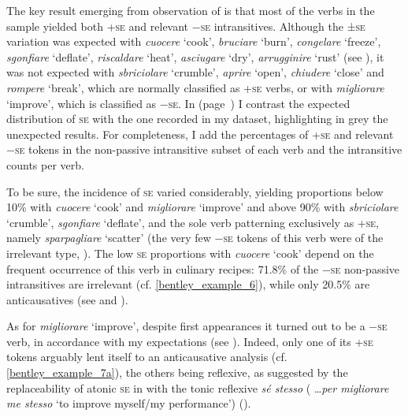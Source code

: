 \documentclass[output=paper,colorlinks,citecolor=brown
]{langscibook}
\begin{document}
The key result emerging from observation of  is that most of the verbs in the sample yielded both +\textsc{se} and relevant −\textsc{se} intransitives. Although the ±\textsc{se} variation was expected with \textit{cuocere} ‘cook’, \textit{bruciare} ‘burn’, \textit{congelare} ‘freeze’, \textit{sgonfiare} ‘deflate’, \textit{riscaldare} ‘heat’, \textit{asciugare} ‘dry’, \textit{arrugginire} ‘rust’ (see ), it was not expected with \textit{sbriciolare} ‘crumble’, \textit{aprire} ‘open’, \textit{chiudere} ‘close’ and \textit{rompere} ‘break’, which are normally classified as +\textsc{se} verbs, or with \textit{migliorare} ‘improve’, which is classified as −\textsc{se}. In  (page~\pageref{tab:bentley_table_2}) I contrast the expected distribution of \textsc{se} with the one recorded in my dataset, highlighting in grey the unexpected results. For completeness, I add the percentages of +\textsc{se} and relevant −\textsc{se} tokens in the non-passive intransitive subset of each verb and the intransitive counts per verb.

To be sure, the incidence of \textsc{se} varied considerably, yielding proportions below 10\% with \textit{cuocere} ‘cook’ and \textit{migliorare} ‘improve’ and above 90\% with \textit{sbriciolare} ‘crumble’, \textit{sgonfiare} ‘deflate’, and the sole verb patterning exclusively as +\textsc{se}, namely \textit{sparpagliare} ‘scatter’ (the very few −\textsc{se} tokens of this verb were of the irrelevant type, ). The low \textsc{se} proportions with \textit{cuocere} ‘cook’ depend on the frequent occurrence of this verb in culinary recipes: 71.8\% of the −\textsc{se} non-passive intransitives are irrelevant (cf. \ref{bentley_example_6}), while only 20.5\% are anticausatives (see  and ).

As for \textit{migliorare} ‘improve’, despite first appearances it turned out to be a −\textsc{se} verb, in accordance with my expectations (see ). Indeed, only one of its +\textsc{se} tokens arguably lent itself to an anticausative analysis (cf. \ref{bentley_example_7a}), the others being reflexive, as suggested by the replaceability of atonic \textsc{se} in  with the tonic reflexive \textit{sé stesso} ( \ldots  \textit{per migliorare me stesso} ‘to improve myself/my performance’) ().
\end{document}
